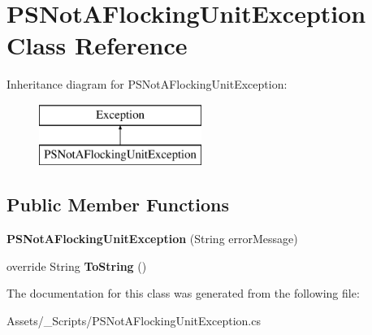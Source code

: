 \hypertarget{class_p_s_not_a_flocking_unit_exception}{}\section{P\+S\+Not\+A\+Flocking\+Unit\+Exception Class Reference}
\label{class_p_s_not_a_flocking_unit_exception}
Inheritance diagram for P\+S\+Not\+A\+Flocking\+Unit\+Exception\+:\begin{figure}[H]
\begin{center}
\leavevmode
\includegraphics[height=2.000000cm]{class_p_s_not_a_flocking_unit_exception}
\end{center}
\end{figure}
\subsection*{Public Member Functions}
\begin{DoxyCompactItemize}
\item 
\mbox{\label{class_p_s_not_a_flocking_unit_exception_a081e50bf2e3d63b1ef54853e2417d9f9}} 
{\bfseries P\+S\+Not\+A\+Flocking\+Unit\+Exception} (String error\+Message)
\item 
\mbox{\label{class_p_s_not_a_flocking_unit_exception_a4abc36449fa9327545a93a6d768615f9}} 
override String {\bfseries To\+String} ()
\end{DoxyCompactItemize}


The documentation for this class was generated from the following file\+:\begin{DoxyCompactItemize}
\item 
Assets/\+\_\+\+Scripts/P\+S\+Not\+A\+Flocking\+Unit\+Exception.\+cs\end{DoxyCompactItemize}
